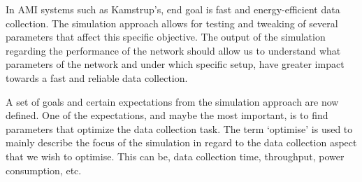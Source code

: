In AMI systems such as Kamstrup's, end goal is fast and energy-efficient data collection. The simulation approach allows for testing and tweaking of several parameters that affect this specific objective. The output of the simulation regarding the performance of the network should allow us to understand what parameters of the network and under which specific setup, have greater impact towards a fast and reliable data collection.

A set of goals and certain expectations from the simulation approach are now defined. One of the expectations, and maybe the most important, is to find parameters that optimize the data collection task. The term `optimise' is used to mainly describe the focus of the simulation in regard to the data collection aspect that we wish to optimise. This can be, data collection  time, throughput, power consumption, etc.


